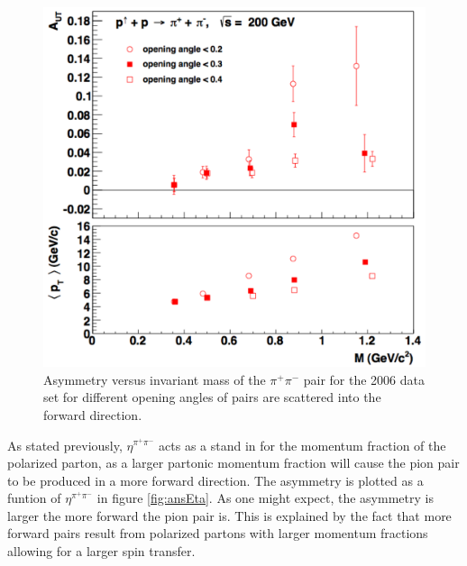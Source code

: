 \documentclass[abstract = on,listof=totoc, bibliography=totoc]{scrreprt}
\newcommand{\etapair}{\eta^{\pi^+\pi^-}}
\newcommand{\pip}{\pi^+}
\newcommand{\pim}{\pi^-}
\newcommand{\pair}{$\pip\pim$ }
\begin{document}
 \begin{figure}
\begin{center}
\includegraphics[width = 1\textwidth]{ansAngles_new}
\caption[$A_{UT}$ for different opening angles]{Asymmetry versus invariant mass of the \pair pair for the 2006 data set for different opening angles of pairs are scattered into the forward direction.}
\label{fig:ansAng}
\end{center}
\end{figure}

As stated previously, $\etapair$ acts as a stand in for the momentum fraction of the polarized parton, as a larger partonic momentum fraction will cause the pion pair to be produced in a more forward direction. The asymmetry is plotted as a funtion of $\etapair$ in figure \ref{fig:ansEta}. As one might expect, the asymmetry is larger the more forward the pion pair is. This is explained by the fact that more forward pairs result from polarized partons with larger momentum fractions allowing for a larger spin transfer. 
\end{document}
